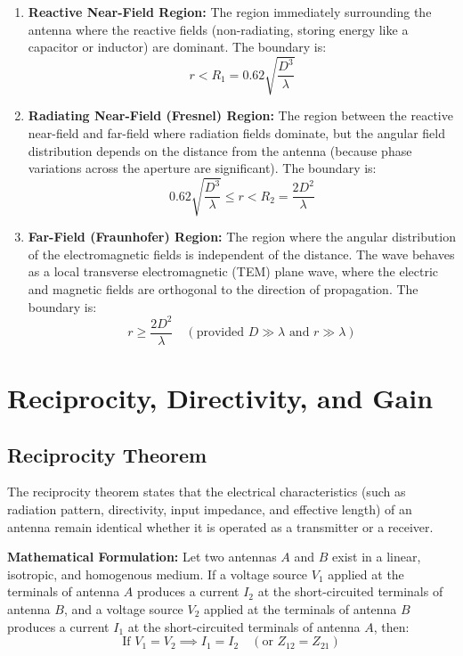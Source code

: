 \documentclass[12pt,a4paper]{article}
\begin{document}
\begin{enumerate}[label=\textbf{\arabic*.}, leftmargin=*, itemsep=4pt]
  \item \textbf{Reactive Near-Field Region:} The region immediately surrounding the antenna where the reactive fields (non-radiating, storing energy like a capacitor or inductor) are dominant. The boundary is:
  \[
  r < R_1 = 0.62\sqrt{\frac{D^3}{\lambda}}
  \]
  \item \textbf{Radiating Near-Field (Fresnel) Region:} The region between the reactive near-field and far-field where radiation fields dominate, but the angular field distribution depends on the distance from the antenna (because phase variations across the aperture are significant). The boundary is:
  \[
  0.62\sqrt{\frac{D^3}{\lambda}} \le r < R_2 = \frac{2D^2}{\lambda}
  \]
  \item \textbf{Far-Field (Fraunhofer) Region:} The region where the angular distribution of the electromagnetic fields is independent of the distance. The wave behaves as a local transverse electromagnetic (TEM) plane wave, where the electric and magnetic fields are orthogonal to the direction of propagation. The boundary is:
  \[
  r \ge \frac{2D^2}{\lambda} \quad (\text{provided } D \gg \lambda \text{ and } r \gg \lambda)
  \]
\end{enumerate}

\section{Reciprocity, Directivity, and Gain}

\subsection{Reciprocity Theorem}
The reciprocity theorem states that the electrical characteristics (such as radiation pattern, directivity, input impedance, and effective length) of an antenna remain identical whether it is operated as a transmitter or a receiver.

\textbf{Mathematical Formulation:} Let two antennas $A$ and $B$ exist in a linear, isotropic, and homogenous medium. If a voltage source $V_1$ applied at the terminals of antenna $A$ produces a current $I_2$ at the short-circuited terminals of antenna $B$, and a voltage source $V_2$ applied at the terminals of antenna $B$ produces a current $I_1$ at the short-circuited terminals of antenna $A$, then:
\[
\text{If } V_1 = V_2 \implies I_1 = I_2 \quad (\text{or } Z_{12} = Z_{21})
\]
\end{document}
